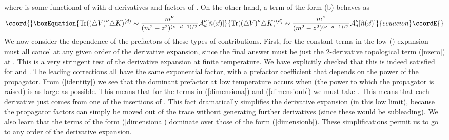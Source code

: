 \documentclass[a4paper,prd]{revtex4}
\begin{document}
where \coordHE{} is some functional of 
\coordHE{} with d derivatives and \coordHE{} factors of 
\coordHE{}.
On the other hand,  a term of the form (b) behaves as 
\begin{equation}\coord{}\boxEquation{
\textrm{Tr}((\triangle V)^{\nu}\triangle K)^{(d)}\sim 
\frac{m^{\nu}}{(m^{2}-z^{2})^{(\nu +d -1)/2}} \mathcal{A}_{d}^{\nu }[\hat{n}(\vec{x})]
\label{dimensionb}
}{
\textrm{Tr}((\triangle V)^{\nu}\triangle K)^{(d)}\sim 
\frac{m^{\nu}}{(m^{2}-z^{2})^{(\nu +d -1)/2}} \mathcal{A}_{d}^{\nu }[\hat{n}(\vec{x})]
}{ecuacion}\coordE{}\end{equation}
We now consider the \coordHE{} dependence of the prefactors of these types of 
contributions. First, for \coordHE{} the constant terms in the low \coordHE{}
(\coordHE{}) expansion  must all cancel at any given order \coordHE{} of the
derivative expansion, since the final answer must be just the
2-derivative topological term (\ref{nzero}) at \coordHE{}. This is a very
stringent test of the derivative expansion at finite temperature. We have
explicitly checked that this is indeed satisfied for \coordHE{} and \coordHE{}. The
leading corrections all have the same exponential factor, with a prefactor
coefficient that depends on the power of the propagator. From
(\ref{identity}) we see that the dominant prefactor at low temperature
occurs when \coordHE{} (the power to which the propagator is raised) is as large
as possible. This means that for the terms in (\ref{dimensiona}) and
(\ref{dimensionb}) we must take \coordHE{}. This means that each derivative
just comes from one of the insertions of \coordHE{}. This fact dramatically simplifies the derivative
expansion (in this low \coordHE{} limit), because the propagator factors can
simply be moved out of the trace without generating further derivatives
(since these would be subleading). We also learn that the terms
of the form (\ref{dimensiona}) dominate over those of the form
(\ref{dimensionb}). These simplifications permit us to go to any order of
the derivative expansion.
\end{document}
